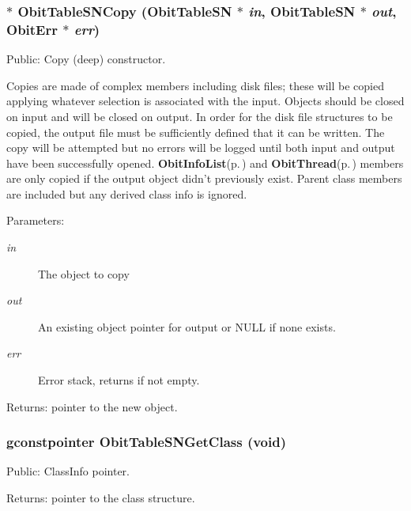 \subsubsection{$\ast$ Obit\-Table\-SNCopy ({\bf Obit\-Table\-SN} $\ast$ {\em in}, {\bf Obit\-Table\-SN} $\ast$ {\em out}, {\bf Obit\-Err} $\ast$ {\em err})}\label{ObitTableSN_8c_a20}


Public: Copy (deep) constructor. 

Copies are made of complex members including disk files; these will be copied applying whatever selection is associated with the input. Objects should be closed on input and will be closed on output. In order for the disk file structures to be copied, the output file must be sufficiently defined that it can be written. The copy will be attempted but no errors will be logged until both input and output have been successfully opened. {\bf Obit\-Info\-List}{\rm (p.\,\pageref{structObitInfoList})} and {\bf Obit\-Thread}{\rm (p.\,\pageref{structObitThread})} members are only copied if the output object didn't previously exist. Parent class members are included but any derived class info is ignored. \begin{Desc}
\item[Parameters:]
\begin{description}
\item[{\em in}]The object to copy \item[{\em out}]An existing object pointer for output or NULL if none exists. \item[{\em err}]Error stack, returns if not empty. \end{description}
\end{Desc}
\begin{Desc}
\item[Returns:]pointer to the new object. \end{Desc}
\subsubsection{\setlength{\rightskip}{0pt plus 5cm}gconstpointer Obit\-Table\-SNGet\-Class (void)}\label{ObitTableSN_8c_a17}


Public: Class\-Info pointer. 

\begin{Desc}
\item[Returns:]pointer to the class structure. \end{Desc}
